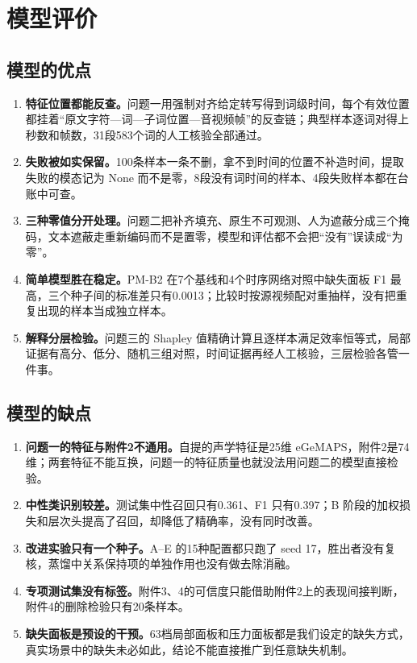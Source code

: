 \section{模型评价}\label{sec:eval}

\subsection{模型的优点}

\begin{enumerate}[label=\arabic*.]
\item \textbf{特征位置都能反查。}问题一用强制对齐给定转写得到词级时间，每个有效位置都挂着“原文字符—词—子词位置—音视频帧”的反查链；典型样本逐词对得上秒数和帧数，31段583个词的人工核验全部通过。
\item \textbf{失败被如实保留。}100条样本一条不删，拿不到时间的位置不补造时间，提取失败的模态记为 None 而不是零，8段没有词时间的样本、4段失败样本都在台账中可查。
\item \textbf{三种零值分开处理。}问题二把补齐填充、原生不可观测、人为遮蔽分成三个掩码，文本遮蔽走重新编码而不是置零，模型和评估都不会把“没有”误读成“为零”。
\item \textbf{简单模型胜在稳定。}PM-B2 在7个基线和4个时序网络对照中缺失面板 F1 最高，三个种子间的标准差只有0.0013；比较时按源视频配对重抽样，没有把重复出现的样本当成独立样本。
\item \textbf{解释分层检验。}问题三的 Shapley 值精确计算且逐样本满足效率恒等式，局部证据有高分、低分、随机三组对照，时间证据再经人工核验，三层检验各管一件事。
\end{enumerate}

\subsection{模型的缺点}

\begin{enumerate}[label=\arabic*.]
\item \textbf{问题一的特征与附件2不通用。}自提的声学特征是25维 eGeMAPS，附件2是74维；两套特征不能互换，问题一的特征质量也就没法用问题二的模型直接检验。
\item \textbf{中性类识别较差。}测试集中性召回只有0.361、F1 只有0.397；B 阶段的加权损失和层次头提高了召回，却降低了精确率，没有同时改善。
\item \textbf{改进实验只有一个种子。}A–E 的15种配置都只跑了 seed 17，胜出者没有复核，蒸馏中关系保持项的单独作用也没有做去除消融。
\item \textbf{专项测试集没有标签。}附件3、4的可信度只能借助附件2上的表现间接判断，附件4的删除检验只有20条样本。
\item \textbf{缺失面板是预设的干预。}63档局部面板和压力面板都是我们设定的缺失方式，真实场景中的缺失未必如此，结论不能直接推广到任意缺失机制。
\end{enumerate}

